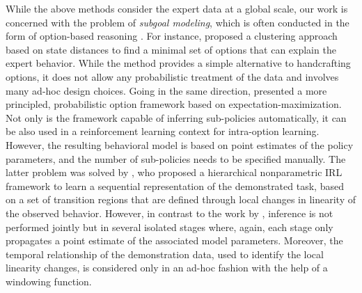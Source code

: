 \documentclass[twoside,11pt]{article}
\begin{document}
While the above methods %
%
consider %
%
%
the expert data %
at a global scale, 
%
%
%
%
%
our work is concerned with the problem of %
%
\textit{subgoal modeling},
which %
%
%
is often
conducted in the form of option-based %
reasoning \citep{sutton1999between}. For instance, \cite{tamassia2015learning} proposed a clustering approach based on state distances to find a minimal set of options that can explain the %
expert behavior. While the method provides a simple alternative to handcrafting options, it does not allow any probabilistic treatment of the data and involves many ad-hoc design choices.
Going in the same direction, \cite{daniel2016probabilistic} presented a more principled, probabilistic option framework based on expectation-maximization. Not only is the framework capable of inferring %
sub-policies %
automatically, it can be also used in a reinforcement learning context for intra-option learning. However, the resulting behavioral model is based on point estimates of the %
policy parameters, and the number of sub-policies needs to be specified manually.
The latter problem was solved by \cite{hirl2016}, who proposed a hierarchical nonparametric IRL framework to learn a sequential representation of the demonstrated task, based on a set of transition regions that are defined through local changes in linearity of the observed behavior. %
However, in contrast to the work by \cite{daniel2016probabilistic}, inference is not performed jointly but in several isolated stages where, again, each stage only propagates a point estimate of the associated model 
parameters. Moreover, the temporal relationship of the demonstration data, used to identify the local linearity changes, is considered only in an ad-hoc fashion with the help of a windowing function.
\end{document}
